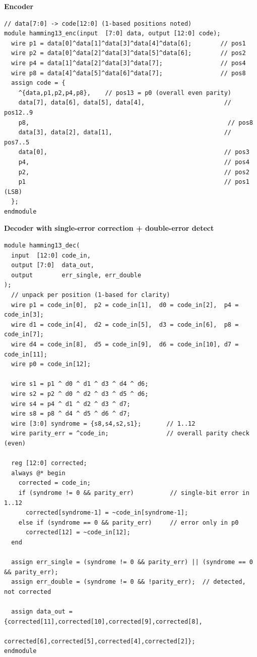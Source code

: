 \documentclass[11pt]{article}
\begin{document}
\noindent\textbf{Encoder}
\begin{lstlisting}[style=verilog]
// data[7:0] -> code[12:0] (1-based positions noted)
module hamming13_enc(input  [7:0] data, output [12:0] code);
  wire p1 = data[0]^data[1]^data[3]^data[4]^data[6];        // pos1
  wire p2 = data[0]^data[2]^data[3]^data[5]^data[6];        // pos2
  wire p4 = data[1]^data[2]^data[3]^data[7];                // pos4
  wire p8 = data[4]^data[5]^data[6]^data[7];                // pos8
  assign code = {
    ^{data,p1,p2,p4,p8},    // pos13 = p0 (overall even parity)
    data[7], data[6], data[5], data[4],                      // pos12..9
    p8,                                                       // pos8
    data[3], data[2], data[1],                               // pos7..5
    data[0],                                                 // pos3
    p4,                                                      // pos4
    p2,                                                      // pos2
    p1                                                       // pos1 (LSB)
  };
endmodule
\end{lstlisting}


\newpage

\noindent\textbf{Decoder with single-error correction + double-error detect}
\begin{lstlisting}[style=verilog]
module hamming13_dec(
  input  [12:0] code_in,
  output [7:0]  data_out,
  output        err_single, err_double
);
  // unpack per position (1-based for clarity)
  wire p1 = code_in[0],  p2 = code_in[1],  d0 = code_in[2],  p4 = code_in[3];
  wire d1 = code_in[4],  d2 = code_in[5],  d3 = code_in[6],  p8 = code_in[7];
  wire d4 = code_in[8],  d5 = code_in[9],  d6 = code_in[10], d7 = code_in[11];
  wire p0 = code_in[12];

  wire s1 = p1 ^ d0 ^ d1 ^ d3 ^ d4 ^ d6;
  wire s2 = p2 ^ d0 ^ d2 ^ d3 ^ d5 ^ d6;
  wire s4 = p4 ^ d1 ^ d2 ^ d3 ^ d7;
  wire s8 = p8 ^ d4 ^ d5 ^ d6 ^ d7;
  wire [3:0] syndrome = {s8,s4,s2,s1};       // 1..12
  wire parity_err = ^code_in;                // overall parity check (even)

  reg [12:0] corrected;
  always @* begin
    corrected = code_in;
    if (syndrome != 0 && parity_err)          // single-bit error in 1..12
      corrected[syndrome-1] = ~code_in[syndrome-1];
    else if (syndrome == 0 && parity_err)     // error only in p0
      corrected[12] = ~code_in[12];
  end

  assign err_single = (syndrome != 0 && parity_err) || (syndrome == 0 && parity_err);
  assign err_double = (syndrome != 0 && !parity_err);  // detected, not corrected

  assign data_out = {corrected[11],corrected[10],corrected[9],corrected[8],
                     corrected[6],corrected[5],corrected[4],corrected[2]};
endmodule
\end{lstlisting}
\end{document}

